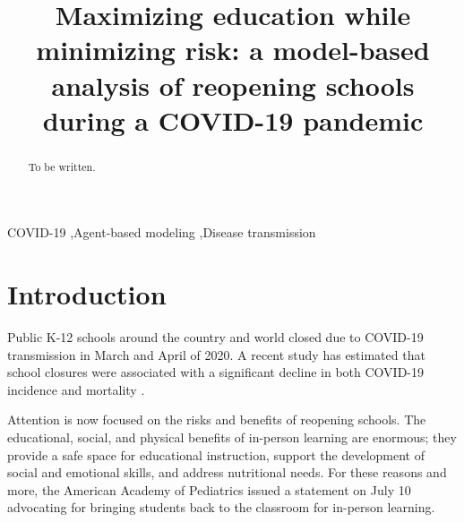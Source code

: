 \documentclass[preprint,12pt]{elsarticle}
\begin{document}
\begin{frontmatter}

\title{Maximizing education while minimizing risk: a model-based analysis of reopening schools during a COVID-19 pandemic}






\begin{abstract}
To be written.
\end{abstract}

\begin{keyword}
COVID-19 \sep Agent-based modeling \sep Disease transmission


\end{keyword}

\end{frontmatter}



\section{Introduction}

Public K-12 schools around the country and world closed due to COVID-19 transmission in March and April of 2020. A recent study has estimated that school closures were associated with a significant decline in both COVID-19 incidence and mortality \cite{auger_association_2020}. 

Attention is now focused on the risks and benefits of reopening schools. The educational, social, and physical benefits of in-person learning are enormous; they provide a safe space for educational instruction, support the development of social and emotional skills, and address nutritional needs. For these reasons and more, the American Academy of Pediatrics issued a statement \cite{AAPstatement} on July 10 advocating for bringing students back to the classroom for in-person learning. 
\end{document}
